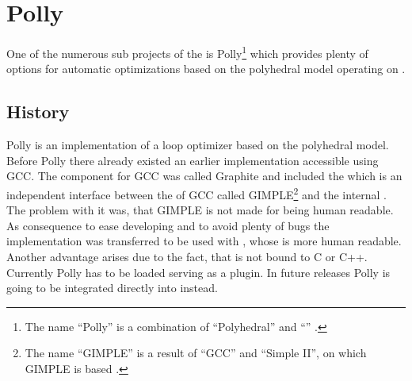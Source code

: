 \chapter{Polly}
One of the numerous sub projects of the \llvm is Polly\footnote{The name \enquote{Polly} is a combination of \enquote{Polyhedral} and \enquote{\llvm} \cite{PollyGrosser}.} which provides plenty of options for automatic optimizations based on the polyhedral model operating on \llvmir.

\section{History}
Polly is an implementation of a loop optimizer based on the polyhedral model.\\
Before Polly there already existed an earlier implementation accessible using GCC.
The component for GCC was called Graphite \cite{gccGraphite} and included the \pcp \cite{GrosserGraphite, GrosserGraphiteDesign} which is an independent interface between the \ir of GCC called GIMPLE\footnote{The name \enquote{GIMPLE} is a result of \enquote{GCC} and \enquote{Simple II}, on which GIMPLE is based \cite{GenericGimple}.} and the internal \ir \gpoly.
The problem with it was, that GIMPLE is not made for being human readable.
As consequence to ease developing and to avoid plenty of bugs the implementation was transferred to be used with \llvm, whose \ir is more human readable.
Another advantage arises due to the fact, that \llvm is not bound to C or C++.
Currently Polly has to be loaded serving as a \llvm plugin.
In future releases Polly is going to be integrated directly into \llvm instead.

